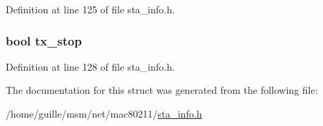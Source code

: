Definition at line 125 of file sta\-\_\-info.\-h.

\hypertarget{structtid__ampdu__tx_a71f0a6678e6562dafeeb34a9d175f22f}{
\subsubsection[{tx\-\_\-stop}]{\setlength{\rightskip}{0pt plus 5cm}bool tx\-\_\-stop}}\label{structtid__ampdu__tx_a71f0a6678e6562dafeeb34a9d175f22f}


Definition at line 128 of file sta\-\_\-info.\-h.



The documentation for this struct was generated from the following file\-:\begin{DoxyCompactItemize}
\item 
/home/guille/msm/net/mac80211/\hyperlink{sta__info_8h}{sta\-\_\-info.\-h}\end{DoxyCompactItemize}
